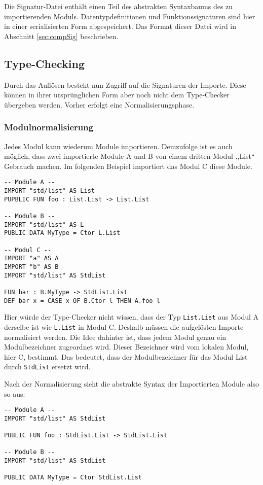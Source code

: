 \documentclass[runningheads]{llncs}
\begin{document}
Die Signatur-Datei enthält einen Teil des abstrakten Syntaxbaums des zu importierenden Moduls. Datentypdefinitionen und Funktionssignaturen sind hier in einer serialisierten Form abgespeichert. Das Format dieser Datei wird in Abschnitt \ref{sec:compSig} beschrieben.

\subsection{Type-Checking}

Durch das Auflösen besteht nun Zugriff auf die Signaturen der Importe. Diese können in ihrer ursprünglichen Form aber noch nicht dem Type-Checker übergeben werden. Vorher erfolgt eine Normalisierungsphase.

\subsubsection{Modulnormalisierung}

Jedes Modul kann wiederum Module importieren. Demzufolge ist es auch möglich, dass zwei importierte Module A und B von einem dritten Modul ,,List`` Gebrauch machen. Im folgenden Beispiel importiert das Modul C diese Module.


\begin{verbatim}
-- Module A --
IMPORT "std/list" AS List
PUPBLIC FUN foo : List.List -> List.List

-- Module B --
IMPORT "std/list" AS L
PUBLIC DATA MyType = Ctor L.List

-- Modul C --
IMPORT "a" AS A
IMPORT "b" AS B
IMPORT "std/list" AS StdList

FUN bar : B.MyType -> StdList.List
DEF bar x = CASE x OF B.Ctor l THEN A.foo l
\end{verbatim}

Hier würde der Type-Checker nicht wissen, dass der Typ \verb|List.List| aus Modul A derselbe ist wie \verb|L.List| in Modul C. Deshalb müssen die aufgelösten Importe normalisiert werden. Die Idee dahinter ist, dass jedem Modul genau ein Modulbezeichner zugeordnet wird. Dieser Bezeichner wird vom lokalen Modul, hier C, bestimmt. Das bedeutet, dass der Modulbezeichner für das Modul List durch \verb|StdList| ersetzt wird.

Nach der Normalisierung sieht die abstrakte Syntax der Importierten Module also so aus:

\begin{verbatim}
-- Module A --
IMPORT "std/list" AS StdList

PUBLIC FUN foo : StdList.List -> StdList.List

-- Module B --
IMPORT "std/list" AS StdList

PUBLIC DATA MyType = Ctor StdList.List
\end{verbatim}
\end{document}
